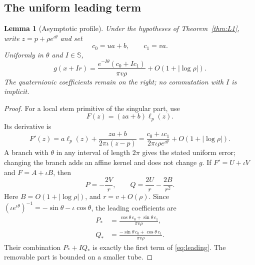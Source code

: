 \documentclass[11pt,a4paper]{article}
\numberwithin{equation}{section}
\newtheorem{lemma}[theorem]{Lemma}
\theoremstyle{definition}
\theoremstyle{remark}
\newcommand{\SSS}{\mathbb S}
\newcommand{\ic}{\iota}
\begin{document}
\subsection{The uniform leading term}
\begin{lemma}[Asymptotic profile]\label{lem:leading}
Under the hypotheses of Theorem~\ref{thm:L1}, write
$z=p+\rho e^{\ic\theta}$ and set
\begin{equation}
 c_0=ua+b,\qquad c_1=va.
 \label{eq:cs}
\end{equation}
Uniformly in $\theta$ and $I\in\SSS$,
\begin{equation}
 g(x+Ir)=\frac{e^{-I\theta}(c_0+I c_1)}{\pi v\rho}
             +O(1+|\log\rho|).
 \label{eq:leading}
\end{equation}
The quaternionic coefficients remain on the right; no commutation with $I$
is implicit.
\end{lemma}
\begin{proof}
For a local stem primitive of the singular part, use
\[
 F(z)=(za+b)\ell_p(z).
\]
Its derivative is
\[
 F'(z)=a\ell_p(z)+\frac{za+b}{2\pi\ic(z-p)}
      =\frac{c_0+\ic c_1}{2\pi\ic\rho e^{\ic\theta}}
          +O(1+|\log\rho|).
\]
A branch with $\theta$ in any interval of length $2\pi$ gives the stated
uniform error; changing the branch adds an affine kernel and does not change
$g$. If $F'=U+\ic V$ and $F=A+\ic B$, then
\[
 P=-\frac{2V}{r},\qquad Q=\frac{2U}{r}-\frac{2B}{r^2}.
\]
Here $B=O(1+|\log\rho|)$, and $r=v+O(\rho)$.
Since $(\ic e^{\ic\theta})^{-1}=-\sin\theta-\ic\cos\theta$, the leading
coefficients are
\begin{align}
 P_*&=\frac{\cos\theta\,c_0+\sin\theta\,c_1}{\pi v\rho},\\
 Q_*&=\frac{-\sin\theta\,c_0+\cos\theta\,c_1}{\pi v\rho}.
 \label{eq:leading-PQ}
\end{align}
Their combination $P_*+I Q_*$ is exactly the first term of
\eqref{eq:leading}. The removable part is bounded on a smaller tube.
\end{proof}
\end{document}
